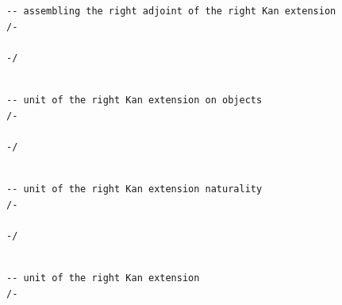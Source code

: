 \documentclass{book}
\theoremstyle{definition}
\newcounter{lcounter}
\begin{document}
{{\begin{center}
\begin{tcolorbox}[width=5in,colback={white},title={\begin{center}\texttt{Lean \thelcounter} \addtocounter{lcounter}{1}  \end{center}},colbacktitle=Blue,coltitle=black]
\begin{verbatim}
-- assembling the right adjoint of the right Kan extension
/-

-/

\end{verbatim}
\end{tcolorbox}
\end{center}

\begin{center}
\begin{tcolorbox}[width=5in,colback={white},title={\begin{center}\texttt{Lean \thelcounter} \addtocounter{lcounter}{1}  \end{center}},colbacktitle=Blue,coltitle=black]
\begin{verbatim}

-- unit of the right Kan extension on objects
/-

-/

\end{verbatim}
\end{tcolorbox}
\end{center}

\begin{center}
\begin{tcolorbox}[width=5in,colback={white},title={\begin{center}\texttt{Lean \thelcounter} \addtocounter{lcounter}{1}  \end{center}},colbacktitle=Blue,coltitle=black]
\begin{verbatim}

-- unit of the right Kan extension naturality
/-

-/

\end{verbatim}
\end{tcolorbox}
\end{center}


\begin{center}
\begin{tcolorbox}[width=5in,colback={white},title={\begin{center}\texttt{Lean \thelcounter} \addtocounter{lcounter}{1}  \end{center}},colbacktitle=Blue,coltitle=black]
\begin{verbatim}

-- unit of the right Kan extension
/-


\end{verbatim}
\end{tcolorbox}
\end{center}}}
\end{document}
